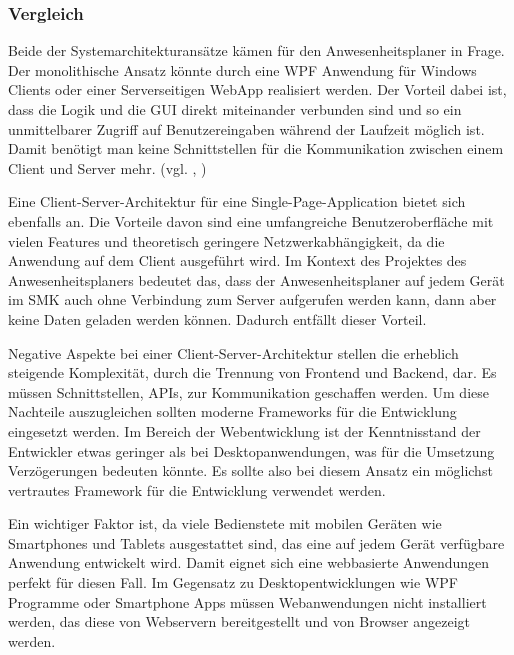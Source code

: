 \subsubsection{Vergleich}
\label{sec:Vergleich}
Beide der Systemarchitekturansätze kämen für den Anwesenheitsplaner in Frage. Der monolithische Ansatz könnte durch eine WPF Anwendung für Windows Clients oder einer Serverseitigen WebApp realisiert werden. Der Vorteil dabei ist, dass die Logik und die GUI direkt miteinander verbunden sind und so ein unmittelbarer Zugriff auf Benutzereingaben während der Laufzeit möglich ist. Damit benötigt man keine Schnittstellen für die Kommunikation zwischen einem Client und Server mehr. (vgl. \cite{wpf}, \cite{modernApp})

Eine Client-Server-Architektur für eine Single-Page-Application bietet sich ebenfalls an. Die Vorteile davon sind eine umfangreiche Benutzeroberfläche mit vielen Features und theoretisch geringere Netzwerkabhängigkeit, da die Anwendung auf dem Client ausgeführt wird. Im Kontext des Projektes des Anwesenheitsplaners bedeutet das, dass der Anwesenheitsplaner auf jedem Gerät im SMK auch ohne Verbindung zum Server aufgerufen werden kann, dann aber keine Daten geladen werden können. Dadurch entfällt dieser Vorteil.

Negative Aspekte bei einer Client-Server-Architektur stellen die erheblich steigende Komplexität, durch die Trennung von Frontend und Backend, dar. Es müssen Schnittstellen, \zB APIs, zur Kommunikation geschaffen werden. Um diese Nachteile auszugleichen sollten moderne Frameworks für die Entwicklung eingesetzt werden. Im Bereich der Webentwicklung ist der Kenntnisstand der Entwickler etwas geringer als bei Desktopanwendungen, was für die Umsetzung Verzögerungen bedeuten könnte. Es sollte also bei diesem Ansatz ein möglichst vertrautes Framework für die Entwicklung verwendet werden.

Ein wichtiger Faktor ist, da viele Bedienstete mit mobilen Geräten wie Smartphones und Tablets ausgestattet sind, das eine auf jedem Gerät verfügbare Anwendung entwickelt wird. Damit eignet sich eine webbasierte Anwendungen perfekt für diesen Fall. Im Gegensatz zu Desktopentwicklungen wie WPF Programme oder Smartphone Apps müssen Webanwendungen nicht installiert werden, das diese von Webservern bereitgestellt und von Browser angezeigt werden.

